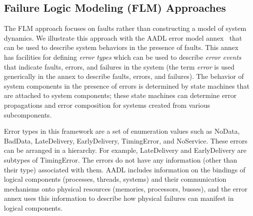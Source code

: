 

\subsection{Failure Logic Modeling (FLM) Approaches}




The FLM approach focuses on faults rather than constructing a model of system dynamics. We illustrate this approach with the AADL error model annex~\cite{SAEAS} that can be used to describe system behaviors in the presence of faults.  This annex has facilities for defining {\em error types} which can be used to describe {\em error events} that indicate faults, errors, and failures in the system (the term {\em error} is used generically in the annex to describe faults, errors, and failures). The behavior of system components in the presence of errors is determined by state machines that are attached to system components; these state machines can determine error propagations and error composition for systems created from various subcomponents.

Error types in this framework are a set of enumeration values such as NoData, BadData, LateDelivery, EarlyDelivery, TimingError, and NoService. These errors can be arranged in a hierarchy. For example, LateDelivery and EarlyDelivery are subtypes of TimingError. The errors do not have any information (other than their type) associated with them. AADL includes information on the bindings of logical components (processes, threads, systems) and their communication mechanisms onto physical resources (memories, processors, busses), and the error annex uses this information to describe how physical failures can manifest in logical components.

